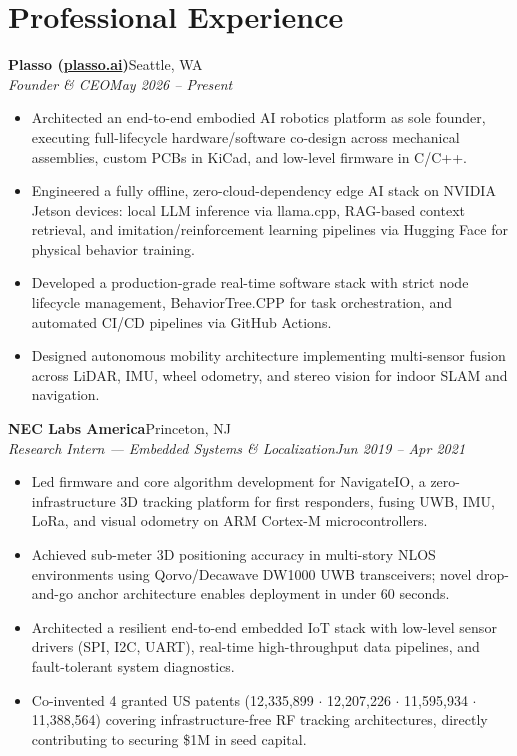 \documentclass[10.5pt,letterpaper]{article}
\newcommand{\entrytitle}[2]{%
  \textbf{#1}\hfill #2%
}
\newcommand{\entrysub}[2]{%
  \vspace{1pt}\textit{#1}\hfill \textit{#2}%
}
\begin{document}
\section{Professional Experience}
\entrytitle{Plasso (\href{https://plasso.ai}{plasso.ai})}{Seattle, WA}\\
\entrysub{Founder \& CEO}{May 2026 -- Present}
\begin{itemize}
    \item Architected an end-to-end embodied AI robotics platform as sole founder, executing full-lifecycle hardware/software co-design across mechanical assemblies, custom PCBs in KiCad, and low-level firmware in C/C++.
    \item Engineered a fully offline, zero-cloud-dependency edge AI stack on NVIDIA Jetson devices: local LLM inference via llama.cpp, RAG-based context retrieval, and imitation/reinforcement learning pipelines via Hugging Face for physical behavior training.
    \item Developed a production-grade real-time software stack with strict node lifecycle management, BehaviorTree.CPP for task orchestration, and automated CI/CD pipelines via GitHub Actions.
    \item Designed autonomous mobility architecture implementing multi-sensor fusion across LiDAR, IMU, wheel odometry, and stereo vision for indoor SLAM and navigation.
\end{itemize}
%
\vspace{2pt}
%
\entrytitle{NEC Labs America}{Princeton, NJ}\\
\entrysub{Research Intern --- Embedded Systems \& Localization}{Jun 2019 -- Apr 2021}
\begin{itemize}
    \item Led firmware and core algorithm development for NavigateIO, a zero-infrastructure 3D tracking platform for first responders, fusing UWB, IMU, LoRa, and visual odometry on ARM Cortex-M microcontrollers.
    \item Achieved sub-meter 3D positioning accuracy in multi-story NLOS environments using Qorvo/Decawave DW1000 UWB transceivers; novel drop-and-go anchor architecture enables deployment in under 60 seconds.
    \item Architected a resilient end-to-end embedded IoT stack with low-level sensor drivers (SPI, I2C, UART), real-time high-throughput data pipelines, and fault-tolerant system diagnostics.
    \item Co-invented 4 granted US patents (12,335,899 $\cdot$ 12,207,226 $\cdot$ 11,595,934 $\cdot$ 11,388,564) covering infrastructure-free RF tracking architectures, directly contributing to securing \$1M in seed capital.
\end{itemize}
\end{document}
